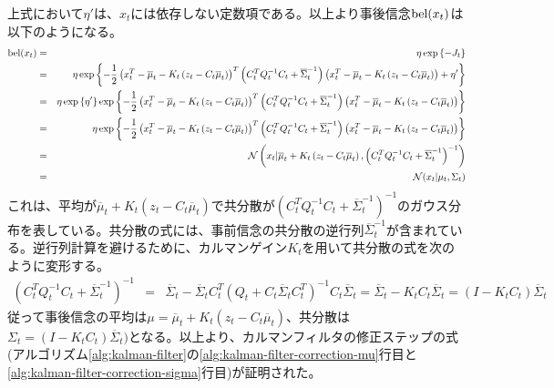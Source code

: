 \documentclass[dvipdfmx,a4paper]{jsarticle}
\begin{document}
上式において$\eta'$は、$x_t$には依存しない定数項である。以上より事後信念$\operatorname{bel}(x_t)$は以下のようになる。
\begin{eqnarray}
	\operatorname{bel}(x_t) &=& \eta \exp \left\{ -J_t \right\} \nonumber \\
	&=& \eta \exp \left\{ -\frac{1}{2} \left( x_t^T - \overline{\mu}_t - K_t \left( z_t - C_t \overline{\mu}_t \right) \right)^T \left( C_t^T Q_t^{-1} C_t + \overline{\Sigma}_t^{-1} \right) \left( x_t^T - \overline{\mu}_t - K_t \left( z_t - C_t \overline{\mu}_t \right) \right) + \eta' \right\} \nonumber \\
	&=& \eta \exp \left\{ \eta' \right\} \exp \left\{ -\frac{1}{2} \left( x_t^T - \overline{\mu}_t - K_t \left( z_t - C_t \overline{\mu}_t \right) \right)^T \left( C_t^T Q_t^{-1} C_t + \overline{\Sigma}_t^{-1} \right) \left( x_t^T - \overline{\mu}_t - K_t \left( z_t - C_t \overline{\mu}_t \right) \right) \right\} \nonumber \\
	&=& \eta \exp \left\{ -\frac{1}{2} \left( x_t^T - \overline{\mu}_t - K_t \left( z_t - C_t \overline{\mu}_t \right) \right)^T \left( C_t^T Q_t^{-1} C_t + \overline{\Sigma}_t^{-1} \right) \left( x_t^T - \overline{\mu}_t - K_t \left( z_t - C_t \overline{\mu}_t \right) \right) \right\} \\
	&=& \mathcal{N} \left( x_t | \overline{\mu}_t + K_t \left( z_t - C_t \overline{\mu}_t \right), \left( C_t^T Q_t^{-1} C_t + \overline{\Sigma}_t^{-1} \right)^{-1} \right) \\
	&=& \mathcal{N}(x_t | \mu_t, \Sigma_t)
\end{eqnarray}
これは、平均が$\overline{\mu}_t + K_t \left( z_t - C_t \overline{\mu}_t \right)$で共分散が$\left( C_t^T Q_t^{-1} C_t + \overline{\Sigma}_t^{-1} \right)^{-1}$のガウス分布を表している。共分散の式には、事前信念の共分散の逆行列$\overline{\Sigma}_t^{-1}$が含まれている。逆行列計算を避けるために、カルマンゲイン$K_t$を用いて共分散の式を次のように変形する。
\begin{eqnarray}
	\left( C_t^T Q_t^{-1} C_t + \overline{\Sigma}_t^{-1} \right)^{-1} &=& \overline{\Sigma}_t - \overline{\Sigma}_t C_t^T \left( Q_t + C_t \overline{\Sigma}_t C_t^T \right)^{-1} C_t \overline{\Sigma}_t = \overline{\Sigma}_t - K_t C_t \overline{\Sigma}_t = \left( I - K_t C_t \right) \overline{\Sigma}_t
\end{eqnarray}
従って事後信念の平均は$\mu = \overline{\mu}_t + K_t \left( z_t - C_t \overline{\mu}_t \right)$、共分散は$\Sigma_t = \left( I - K_t C_t \right) \overline{\Sigma}_t)$となる。以上より、カルマンフィルタの修正ステップの式(アルゴリズム\ref{alg:kalman-filter}の\ref{alg:kalman-filter-correction-mu}行目と\ref{alg:kalman-filter-correction-sigma}行目)が証明された。



\end{document}
